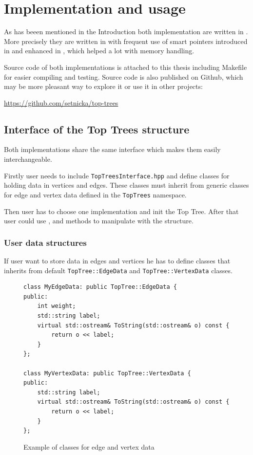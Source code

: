 \chapter{Implementation and usage}
\label{chap:Implementation}

As has beeen mentioned in the Introduction both implementation are written in
\Cpp. More precisely they are written in  with frequent use of smart
pointers introduced in  and enhanced in , which helped a lot with
memory handling.

Source code of both implementations is attached to this thesis including
Makefile for easier compiling and testing. Source code is also published on
Github, which may be more pleasant way to explore it or use it in other
projects:

\bigskip
\centerline{\url{https://github.com/setnicka/top-trees}}
\bigskip

\section{Interface of the Top Trees structure}

Both implementations share the same interface which makes them easily
interchangeable.

Firstly user needs to include \texttt{TopTreesInterface.hpp} and define classes
for holding data in vertices and edges. These classes must inherit from generic
classes for edge and vertex data defined in the \texttt{TopTrees} namespace.

Then user has to choose one implementation and init the Top Tree. After that
user could use \Cut, \Link{} and \Expose{} methods to manipulate with the structure.

\subsection{User data structures}

If user want to store data in edges and vertices he has to define classes that
inherits from default \texttt{TopTree::EdgeData} and \texttt{TopTree::VertexData}
classes.

\begin{figure}[H]
\begin{verbatim}
class MyEdgeData: public TopTree::EdgeData {
public:
    int weight;
    std::string label;
    virtual std::ostream& ToString(std::ostream& o) const {
        return o << label;
    }
};

class MyVertexData: public TopTree::VertexData {
public:
    std::string label;
    virtual std::ostream& ToString(std::ostream& o) const {
        return o << label;
    }
};
\end{verbatim}
\caption{Example of classes for edge and vertex data}
\end{figure}

